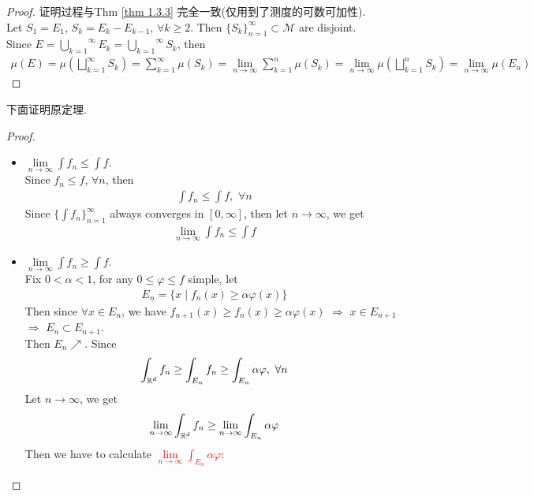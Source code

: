 \begin{thm}
\begin{lemma}
			\vspace{2em}
			\begin{proof}
				证明过程与Thm \ref{thm 1.3.3} 完全一致(仅用到了测度的可数可加性).\\
				Let $S_1 = E_1$, $S_k = E_k - E_{k - 1}$, $\forall k \geq 2$. Then $\{ S_k \}_{n = 1}^{\infty} \subset \mathcal{M}$ are disjoint.\\
				Since $E = \overset{\infty}{\underset{k = 1}{\bigcup}}{E_k} = \overset{\infty}{\underset{k = 1}{\bigcup}}{S_k}$, then
				\begin{align}
					\mu(E) 
					= \mu(\bigsqcup_{k = 1}^{\infty}{S_k}) 
					= \sum_{k = 1}^{\infty}{\mu(S_k)} 
					= \lim_{n \to \infty}{\sum_{k = 1}^{n}{\mu(S_k)}} 
					= \lim_{n \to \infty}{\mu(\bigsqcup_{k = 1}^{n}{S_k})} 
					= \lim_{n \to \infty}{\mu(E_n)}
				\end{align}
			\end{proof}
		\end{lemma}
		
		\vspace{2em}
		下面证明原定理.
		\begin{proof}
			\begin{itemize}
				\item $\underset{n \to \infty}{\lim}{\int{f_n}} \leq \int{f}$.\\
				Since $f_n \leq f$, $\forall n$, then
				\begin{align}
					\int{f_n} \leq \int{f} , \,\, \forall n
				\end{align}
				Since $\{ \int{f_n} \}_{n = 1}^{\infty}$ always converges in $[0 , \infty]$, then let $n \to \infty$, we get
				\begin{align}
					\lim_{n \to \infty}{\int{f_n}} \leq \int{f}
				\end{align}
				
				\vspace{2em}
				\item $\underset{n \to \infty}{\lim}{\int{f_n}} \geq \int{f}$.\\
				Fix $0 < \alpha < 1$, for any $0 \leq \varphi \leq f$ simple, let
				\begin{align}
					E_n = \{ x \mid f_{n}(x) \geq \alpha \varphi(x) \}
				\end{align}
				Then since $\forall x \in E_n$, we have $f_{n + 1}(x) \geq f_{n}(x) \geq \alpha \varphi(x)$ $\Rightarrow$ $x \in E_{n + 1}$ $\Rightarrow$ $E_n \subset E_{n + 1}$.\\
				Then $E_n \nearrow$. Since
				\begin{align}
					\int_{\mathbb{R}^d}{f_n} \geq \int_{E_n}{f_n} \geq \int_{E_n}{\alpha \varphi} ,  \,\, \forall n
				\end{align}
				Let $n \to \infty$, we get
				\begin{align}
					\lim_{n \to \infty}{\int_{\mathbb{R}^d}{f_n}} \geq \lim_{n \to \infty}{\int_{E_n}{\alpha \varphi}}
				\end{align}
				\newpage
				Then we have to calculate \textcolor{red}{$\underset{n \to \infty}{\lim}{\int_{E_n}{\alpha \varphi}}$}:
				

\end{itemize}
\end{proof}
\end{thm}
